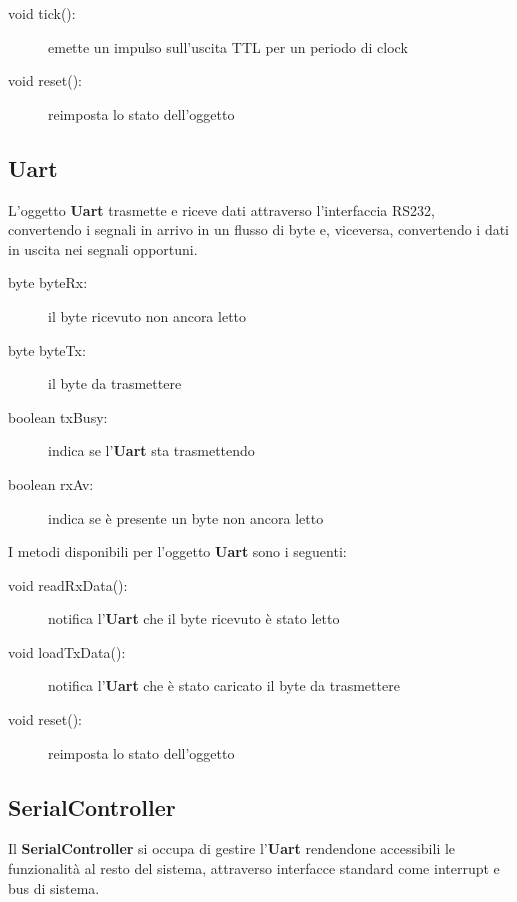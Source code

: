 \documentclass [11pt,a4paper,oneside]{article}
\newcommand{\component}[1]{\textbf{#1}}
\begin{document}
\begin{description}
\item[void tick():] emette un impulso sull'uscita TTL per un periodo di clock
\item[void reset():] reimposta lo stato dell'oggetto
\end{description}

\subsection{Uart}
L'oggetto \component{Uart} trasmette e riceve dati attraverso l'interfaccia RS232,
convertendo i segnali in arrivo in un flusso di byte e, viceversa, convertendo
i dati in uscita nei segnali opportuni.

\begin{description}
\item[byte byteRx:] il byte ricevuto non ancora letto
\item[byte byteTx:] il byte da trasmettere
\item[boolean txBusy:] indica se l'\component{Uart} sta trasmettendo
\item[boolean rxAv:] indica se è presente un byte non ancora letto
\end{description}

I metodi disponibili per l'oggetto \component{Uart} sono i seguenti:

\begin{description}
\item[void readRxData():] notifica l'\component{Uart} che il byte ricevuto è
    stato letto
\item[void loadTxData():] notifica l'\component{Uart} che è stato caricato il
    byte da trasmettere
\item[void reset():] reimposta lo stato dell'oggetto
\end{description}

\subsection{SerialController}
Il \component{SerialController} si occupa di gestire l'\component{Uart}
rendendone accessibili le funzionalità al resto del sistema,
attraverso interfacce standard come interrupt e bus di sistema.
\end{document}
